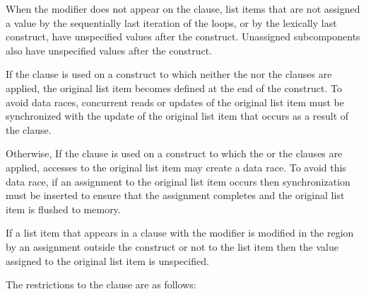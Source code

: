 When the  modifier does not appear on the  
clause, list items that are not assigned a value by the sequentially last 
iteration of the loops, or by the lexically last  construct, 
have unspecified values after the construct. Unassigned subcomponents also 
have unspecified values after the construct.

If the  clause is used on a construct to which neither
the  nor the  clauses are applied, the original list item
becomes defined at the end of the construct.  To avoid data races,
concurrent reads or updates of the original list item must be synchronized with
the update of the original list item that occurs as a result of the
 clause.

Otherwise, If the  clause is used on a construct to which
the  or the  clauses are applied, accesses to the original
list item may create a data race.  To avoid this data race, if an assignment to the
original list item occurs then synchronization must be inserted to ensure that
the assignment completes and the original list item is flushed to memory.

If a list item that appears in a  clause with the
 modifier is modified in the region by an assignment
outside the construct or not to the list item then the value assigned to
the original list item is unspecified.

\restrictions
The restrictions to the  clause are as follows:

